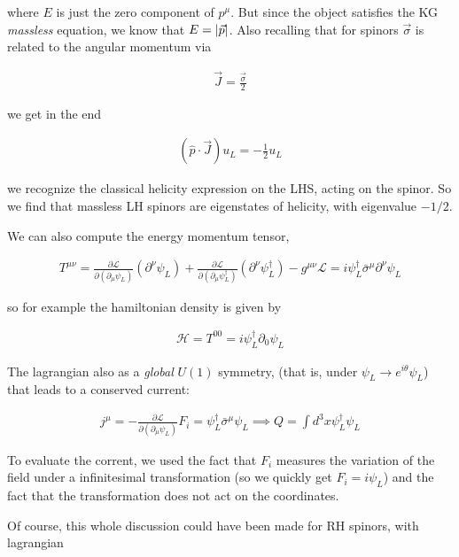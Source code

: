 \documentclass{report}
\begin{document}
where \(E\) is just the zero component of \(p^\mu\). But since the object satisfies the KG \emph{massless} equation, we know that \(E = \lvert\vec{p}\rvert\). Also recalling that for spinors \(\vec{\sigma}\) is related to the angular momentum via 

\begin{align}
    \vec{J} = \frac{\vec{\sigma}}{2}
\end{align}

we get in the end 

\begin{align}
    (\hat{p}\cdot \vec{J})u_L = -\frac{1}{2}u_L 
\end{align}

we recognize the classical helicity expression on the LHS, acting on the spinor. So we find that massless LH spinors are eigenstates of helicity, with eigenvalue \(-1/2\). 

We can also compute the energy momentum tensor, 

\begin{align}
    T^{\mu\nu} = \frac{\partial\mathcal{L}}{\partial(\partial_\mu\psi_L)}(\partial^\nu\psi_L) + \frac{\partial\mathcal{L}}{\partial(\partial_\mu\psi^\dagger_L)}(\partial^\nu\psi^\dagger_L) - g^{\mu\nu}\mathcal{L} = i\psi_L^\dagger\bar{\sigma}^\mu \partial^\nu \psi_L
\end{align}

so for example the hamiltonian density is given by 

\begin{align}
    \mathcal{H} = T^{00} = i\psi_L^\dagger\partial_0\psi_L
\end{align}

The lagrangian also as a \emph{global} \(U(1)\) symmetry, (that is, under \(\psi_L \rightarrow e^{i\theta}\psi_L\)) that leads to a conserved current: 

\begin{align}
    j^\mu = -\frac{\partial\mathcal{L}}{\partial(\partial_\mu\psi_L)}F_i = \psi_L^\dagger\bar{\sigma}^\mu\psi_L \implies Q = \int d^3x \psi_L^\dagger\psi_L
\end{align}

To evaluate the corrent, we used the fact that \(F_i\) measures the variation of the field under a infinitesimal transformation (so we quickly get \(F_i = i\psi_L\)) and the fact that the transformation does not act on the coordinates. 

Of course, this whole discussion could have been made for RH spinors, with lagrangian 
\end{document}
